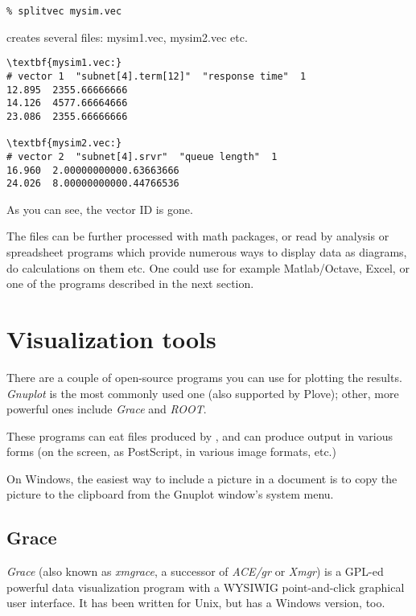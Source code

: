 \begin{verbatim}
% splitvec mysim.vec
\end{verbatim}


creates several files: mysim1.vec, mysim2.vec etc.

\begin{Verbatim}[commandchars=\\\{\}]
\textbf{mysim1.vec:}
# vector 1  "subnet[4].term[12]"  "response time"  1
12.895  2355.66666666
14.126  4577.66664666
23.086  2355.66666666

\textbf{mysim2.vec:}
# vector 2  "subnet[4].srvr"  "queue length"  1
16.960  2.00000000000.63663666
24.026  8.00000000000.44766536
\end{Verbatim}


As you can see, the vector ID is gone.

The files can be further processed with math packages, or read
by analysis or spreadsheet programs which provide numerous ways
to display data as diagrams, do calculations on them etc. One
could use for example Matlab/Octave, Excel, or one of the programs
described in the next section.




\section{Visualization tools}

There are a couple of open-source programs you can use for plotting
the results. \textit{Gnuplot} is the most commonly used one
(also supported by {\opp} Plove); other, more powerful ones
include \textit{Grace} and \textit{ROOT}.

These programs can eat files produced by , and
can produce output in various forms (on the screen, as PostScript,
in various image formats, etc.)

On Windows, the easiest way to include a picture in a document
is to copy the picture to the clipboard from the Gnuplot
window's system menu.


\subsection{Grace}

\textit{Grace} (also known as \textit{xmgrace}, a successor of \textit{ACE/gr} or
\textit{Xmgr}) is a GPL-ed powerful data visualization program
with a WYSIWIG point-and-click graphical user interface. It has been
written for Unix, but has a Windows version, too.

